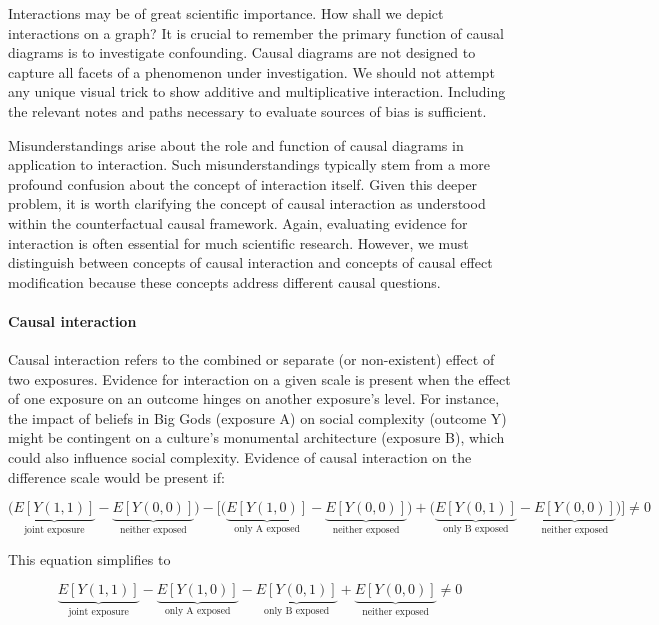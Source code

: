 \documentclass[
  singlecolumn]{article}
\let\oldparagraph\paragraph
\renewcommand{\paragraph}[1]{\oldparagraph{#1}\mbox{}}
\begin{document}
Interactions may be of great scientific importance. How shall we depict
interactions on a graph? It is crucial to remember the primary function
of causal diagrams is to investigate confounding. Causal diagrams are
not designed to capture all facets of a phenomenon under investigation.
We should not attempt any unique visual trick to show additive and
multiplicative interaction. Including the relevant notes and paths
necessary to evaluate sources of bias is sufficient.

Misunderstandings arise about the role and function of causal diagrams
in application to interaction. Such misunderstandings typically stem
from a more profound confusion about the concept of interaction itself.
Given this deeper problem, it is worth clarifying the concept of causal
interaction as understood within the counterfactual causal framework.
Again, evaluating evidence for interaction is often essential for much
scientific research. However, we must distinguish between concepts of
causal interaction and concepts of causal effect modification because
these concepts address different causal questions.

\hypertarget{causal-interaction}{%
\paragraph{\texorpdfstring{\textbf{Causal
interaction}}{Causal interaction}}\label{causal-interaction}}

Causal interaction refers to the combined or separate (or non-existent)
effect of two exposures. Evidence for interaction on a given scale is
present when the effect of one exposure on an outcome hinges on another
exposure's level. For instance, the impact of beliefs in Big Gods
(exposure A) on social complexity (outcome Y) might be contingent on a
culture's monumental architecture (exposure B), which could also
influence social complexity. Evidence of causal interaction on the
difference scale would be present if:

\[\bigg(\underbrace{E[Y(1,1)]}_{\text{joint exposure}} - \underbrace{E[Y(0,0)]}_{\text{neither exposed}}\bigg) - \bigg[ \bigg(\underbrace{E[Y(1,0)]}_{\text{only A exposed}} - \underbrace{E[Y(0,0)]}_{\text{neither exposed}}\bigg) + \bigg(\underbrace{E[Y(0,1)]}_{\text{only B exposed}} - \underbrace{E[Y(0,0)]}_{\text{neither exposed}} \bigg)\bigg] \neq 0 \]

This equation simplifies to

\[ \underbrace{E[Y(1,1)]}_{\text{joint exposure}} - \underbrace{E[Y(1,0)]}_{\text{only A exposed}} - \underbrace{E[Y(0,1)]}_{\text{only B exposed}} + \underbrace{E[Y(0,0)]}_{\text{neither exposed}} \neq 0 \]
\end{document}
